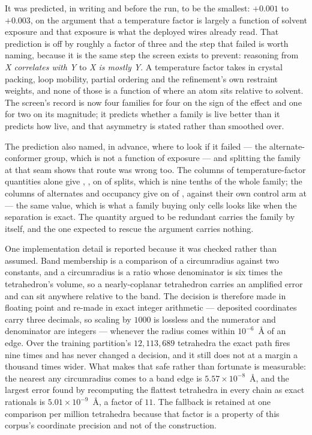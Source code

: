 \documentclass[11pt]{article}
\begin{document}
It was predicted, in writing and before the run, to be the smallest: \(+0.001\)
to \(+0.003\), on the argument that a temperature factor is largely a function of
solvent exposure and that exposure is what the deployed wires already read. That
prediction is off by roughly a factor of three and the step that failed is worth
naming, because it is the same step the screen exists to prevent: reasoning from
\emph{X correlates with Y} to \emph{X is mostly Y}. A temperature factor takes in
crystal packing, loop mobility, partial ordering and the refinement's own
restraint weights, and none of those is a function of where an atom sits relative
to solvent. The screen's record is now four families for four on the sign of the
effect and one for two on its magnitude; it predicts whether a family is live
better than it predicts how live, and that asymmetry is stated rather than
smoothed over.

The prediction also named, in advance, where to look if it failed --- the
alternate-conformer group, which is not a function of exposure --- and splitting
the family at that seam shows that route was wrong too. The
\FamDispBCols{} columns of temperature-factor quantities alone give
\FamDispB{}, \FamDispBCI{}, on \FamDispBSplits{} of \FamDispBOf{} splits, which
is nine tenths of the whole family; the \FamDispAltCols{} columns of alternates
and occupancy give \FamDispAlt{} \FamDispAltCI{} on \FamDispAltSplits{} of
\FamDispAltOf{}, against their own control arm at \FamDispAltControl{} ---
the same value, which is what a family buying only cells looks like when the
separation is exact. The quantity argued to be redundant carries the family by
itself, and the one expected to rescue the argument carries nothing.

One implementation detail is reported because it was checked rather than
assumed. Band membership is a comparison of a circumradius against two
constants, and a circumradius is a ratio whose denominator is six times the
tetrahedron's volume, so a nearly-coplanar tetrahedron carries an amplified
error and can sit anywhere relative to the band. The decision is therefore made
in floating point and re-made in exact integer arithmetic --- deposited
coordinates carry three decimals, so scaling by \(1000\) is lossless and the
numerator and denominator are integers --- whenever the radius comes within
\(10^{-6}\)~\AA{} of an edge. Over the training partition's \(12{,}113{,}689\)
tetrahedra the exact path fires nine times and has never changed a decision,
and it still does not at a margin a thousand times wider. What makes that safe
rather than fortunate is measurable: the nearest any circumradius comes to a
band edge is \(5.57 \times 10^{-8}\)~\AA{}, and the largest error found by
recomputing the flattest tetrahedra in every chain as exact rationals is
\(5.01 \times 10^{-9}\)~\AA{}, a factor of \(11\). The fallback is retained at
one comparison per million tetrahedra because that factor is a property of this
corpus's coordinate precision and not of the construction.
\end{document}
